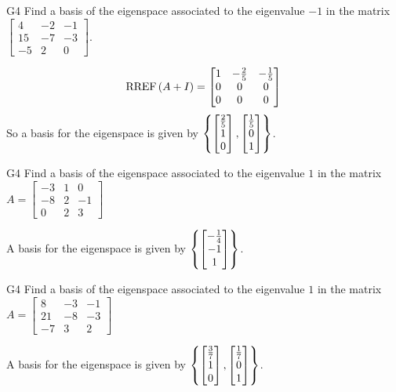 \begin{problem}{G4}
Find a basis of the eigenspace associated to the eigenvalue $-1$ in the matrix $\begin{bmatrix} 4 & -2 & -1 \\ 15 & -7 & -3 \\ -5 & 2 & 0 \end{bmatrix}$. 
\end{problem}
\begin{solution}
$$\operatorname{RREF}\left(A+I\right) = \begin{bmatrix} 1 & - \frac{2}{5} & -\frac{1}{5} \\ 0 & 0 & 0 \\ 0 & 0 & 0 \end{bmatrix}$$
So a basis for the eigenspace is given by \(\left\{\begin{bmatrix} \frac{2}{5} \\1 \\  0 \end{bmatrix},\begin{bmatrix} \frac{1}{5} \\ 0 \\ 1 \end{bmatrix}\right\}\).
\end{solution}

\begin{problem}{G4}
Find a basis of the eigenspace associated to the eigenvalue $1$ in the matrix $A=\begin{bmatrix} -3 & 1 & 0 \\ -8 & 2 & -1 \\ 0 & 2 & 3 \end{bmatrix}$
\end{problem}
\begin{solution}
A basis for the eigenspace is given by $\left\{\begin{bmatrix} -\frac{1}{4} \\ -1 \\ 1 \end{bmatrix}\right\}$.
\end{solution}

\begin{problem}{G4}
Find a basis of the eigenspace associated to the eigenvalue $1$ in the matrix $A=\begin{bmatrix} 8 & -3 & -1 \\ 21 & -8 & -3 \\ -7 & 3  & 2 \end{bmatrix}$
\end{problem}
\begin{solution}
A basis for the eigenspace is given by $\left\{\begin{bmatrix} \frac{3}{7} \\ 1 \\ 0 \end{bmatrix},\begin{bmatrix}\frac{1}{7} \\ 0 \\ 1 \end{bmatrix}\right\}$.
\end{solution}

